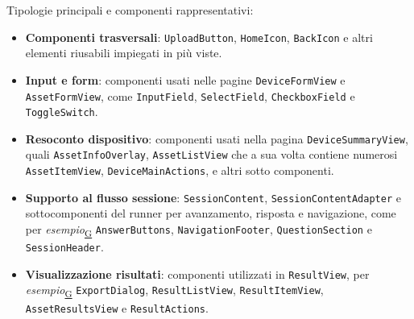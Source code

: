 \documentclass[a4paper,12pt]{article}
\begin{document}
                Tipologie principali e componenti rappresentativi:
                \begin{itemize}
                    \item \textbf{Componenti trasversali}: \texttt{UploadButton}, \texttt{HomeIcon}, \texttt{BackIcon} e altri elementi riusabili impiegati in più viste.
                    \item \textbf{Input e form}: componenti usati nelle pagine \texttt{DeviceFormView} e \texttt{AssetFormView}, come \texttt{InputField}, \texttt{SelectField}, \texttt{CheckboxField} e \texttt{ToggleSwitch}.
                    \item \textbf{Resoconto dispositivo}: componenti usati nella pagina \texttt{DeviceSummaryView}, quali \newline \texttt{AssetInfoOverlay}, \texttt{AssetListView} che a sua volta contiene numerosi \texttt{AssetItemView}, \texttt{DeviceMainActions}, e altri sotto componenti.
                    \item \textbf{Supporto al flusso sessione}: \texttt{SessionContent}, \texttt{SessionContentAdapter} e sottocomponenti del runner per avanzamento, risposta e navigazione, come per \textit{esempio}\textsubscript{\href{https://atlasteam9.github.io/Atlas/glossario.html\#Esempio}{G}} \newline \texttt{AnswerButtons},  \texttt{NavigationFooter}, \texttt{QuestionSection} e \texttt{SessionHeader}.
                    \item \textbf{Visualizzazione risultati}: componenti utilizzati in \texttt{ResultView}, per \textit{esempio}\textsubscript{\href{https://atlasteam9.github.io/Atlas/glossario.html\#Esempio}{G}} \newline \texttt{ExportDialog}, \texttt{ResultListView}, \texttt{ResultItemView}, \texttt{AssetResultsView} e \texttt{ResultActions}.
                \end{itemize}
        
\end{document}
